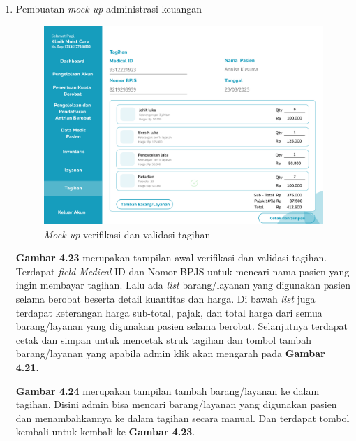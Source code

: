 \begin{enumerate}
	\item Pembuatan \emph{mock up} administrasi keuangan
	
	\begin{figure}[H]
		\centering
		\includegraphics[width=12cm]{gambar/mockup_web/Administrasi Keuangan 1.png}
		\caption{\emph{Mock up} verifikasi dan validasi tagihan}
		\label{Gambar:pengelolaanantrian2}
	\end{figure}
	
	\textbf{Gambar 4.23} merupakan tampilan awal verifikasi dan validasi tagihan. Terdapat \emph{field Medical} ID dan Nomor BPJS untuk mencari nama pasien yang ingin membayar tagihan. Lalu ada \emph{list} barang/layanan yang digunakan pasien selama berobat beserta detail kuantitas dan harga. Di bawah \emph{list} juga terdapat keterangan harga sub-total, pajak, dan total harga dari semua barang/layanan yang digunakan pasien selama berobat. Selanjutnya terdapat cetak dan simpan untuk mencetak struk tagihan dan tombol tambah barang/layanan yang apabila admin klik akan mengarah pada \textbf{Gambar 4.21}.
	
	\textbf{Gambar 4.24} merupakan tampilan tambah barang/layanan ke dalam tagihan. Disini admin bisa mencari barang/layanan yang digunakan pasien dan menambahkannya ke dalam tagihan secara manual. Dan terdapat tombol kembali untuk kembali ke \textbf{Gambar 4.23}.
	

\end{enumerate}
